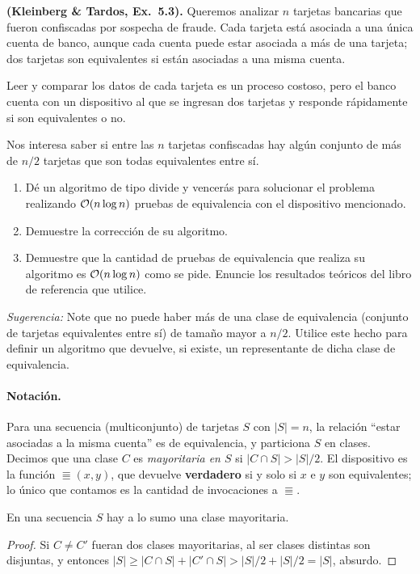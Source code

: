 \begin{enunciado}
\textbf{(Kleinberg \& Tardos, Ex.\ 5.3).} Queremos analizar $n$ tarjetas bancarias que
fueron confiscadas por sospecha de fraude. Cada tarjeta está asociada a una única cuenta
de banco, aunque cada cuenta puede estar asociada a más de una tarjeta; dos tarjetas son
equivalentes si están asociadas a una misma cuenta.

Leer y comparar los datos de cada tarjeta es un proceso costoso, pero el banco cuenta con
un dispositivo al que se ingresan dos tarjetas y responde rápidamente si son equivalentes
o no.

Nos interesa saber si entre las $n$ tarjetas confiscadas hay algún conjunto de más de
$n/2$ tarjetas que son todas equivalentes entre sí.
\begin{enumerate}[label=(\alph*)]
\item Dé un algoritmo de tipo divide y vencerás para solucionar el problema realizando
$\mathcal{O}(n\log n)$ pruebas de equivalencia con el dispositivo mencionado.
\item Demuestre la corrección de su algoritmo.
\item Demuestre que la cantidad de pruebas de equivalencia que realiza su algoritmo es
$\mathcal{O}(n\log n)$ como se pide. Enuncie los resultados teóricos del libro de referencia que
utilice.
\end{enumerate}
\emph{Sugerencia:} Note que no puede haber más de una clase de equivalencia (conjunto de
tarjetas equivalentes entre sí) de tamaño mayor a $n/2$. Utilice este hecho para definir
un algoritmo que devuelve, si existe, un representante de dicha clase de equivalencia.
\end{enunciado}

\paragraph{Notación.} Para una secuencia (multiconjunto) de tarjetas $S$ con $|S|=n$,
la relación ``estar asociadas a la misma cuenta'' es de equivalencia, y
particiona $S$ en clases. Decimos que una clase $C$ es \emph{mayoritaria en $S$} si
$|C\cap S|>|S|/2$. El dispositivo es la función $\Equiv(x,y)$, que devuelve
\textbf{verdadero} si y solo si $x$ e $y$ son equivalentes; lo único que contamos es la
cantidad de invocaciones a $\Equiv$.

\begin{lema}[Unicidad]\label{l:unica}
En una secuencia $S$ hay a lo sumo una clase mayoritaria.
\end{lema}
\begin{proof}
Si $C\ne C'$ fueran dos clases mayoritarias, al ser clases distintas son disjuntas, y
entonces $|S|\ge|C\cap S|+|C'\cap S|>|S|/2+|S|/2=|S|$, absurdo.
\end{proof}

